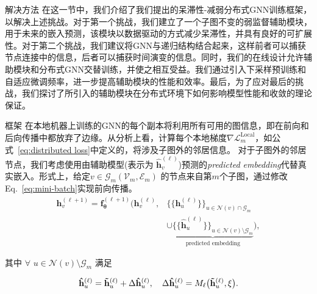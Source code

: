 \begin{section}{解决方法}
    在这一节中，我们介绍了我们提出的呆滞性-减弱分布式GNN训练框架，以解决上述挑战。对于第一个挑战，我们建立了一个子图不变的弱监督辅助模块，用于未来的嵌入预测，该模块以数据驱动的方式减少呆滞性，并具有良好的可扩展性。对于第二个挑战，我们建议将GNN与递归结构结合起来，这样前者可以捕获节点连接中的信息，后者可以捕获时间演变的信息。同时，我们的在线设计允许辅助模块和分布式GNN交替训练，并使之相互受益。我们通过引入下采样预训练和自适应微调频率，进一步提高辅助模块的性能和效率。最后，为了应对最后的挑战，我们探讨了所引入的辅助模块在分布式环境下如何影响模型性能和收敛的理论保证。


    \begin{subsection}{框架} 
        在本地机器上训练的GNN的每个副本将利用所有可用的图信息，即在前向和后向传播中都放弃了边缘。从分析上看，计算每个本地梯度$\nabla\mathcal{L}_{m}^{\text{Local}}$，如公式~\ref{eq:distributed loss}中定义的，将涉及子图外的邻居信息。
        对于子图外的邻居节点，我们考虑使用由辅助模型(表示为 $\mathbf{\hat{h}}^{(\ell)}_{v}$)预测的\emph{predicted embedding}代替真实嵌入。形式上，给定$v\in\mathcal{G}_{m}(\mathcal{V}_{m},\mathcal{E}_{m})$ 的节点来自第$m$个子图，通过修改Eq.~\ref{eq:mini-batch}实现前向传播。
        \begin{equation}
            \begin{split}
            \mathbf{h}_{v}^{(\ell+1)} = \boldsymbol{f}^{(\ell+1)}_{\boldsymbol{\theta}}\Big( \mathbf{h}_{v}^{(\ell)}, &\big\{\!\!\big\{\mathbf{h}^{(\ell)}_u \big\}\!\!\big\}_{u \in  \mathcal{N}(v)   \cap \mathcal{G}_{m}} \\ &\cup \underbrace{\big\{\!\!\big\{\mathbf{\hat{h}}^{(\ell)}_u  \big\}\!\!\big\}_{u \in \mathcal{N}(v) \setminus \mathcal{G}_{m}}}_{\text{predicted embedding}} \Big),
        \end{split}
        \label{eq:synthetic forward}
        \end{equation}
    \end{subsection}
    其中 $\forall$ $u \in \mathcal{N}(v) \setminus \mathcal{G}_{m}$ 满足

    \begin{equation}
        \begin{split}
            \mathbf{\hat{h}}^{(\ell)}_u = \mathbf{\Tilde{h}}^{(\ell)}_u + \Delta\mathbf{\hat{h}}^{(\ell)}_u,\quad\Delta\mathbf{\hat{h}}^{(\ell)}_u = M_{\ell}\big(\mathbf{\Tilde{h}}^{(\ell)}_u, \xi\big).
        \end{split}
    \label{eq:aux def 1}
    \end{equation}


\end{section}
